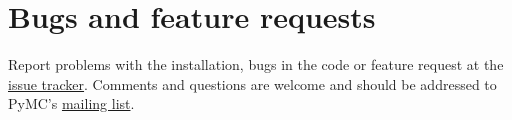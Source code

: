 
\hypertarget{bugs-and-feature-requests}{}
\section*{Bugs and feature requests}

Report problems with the installation, bugs in the code or feature request at 
the \href{http://code.google.com/p/pymc/issues/list.}{issue tracker}. Comments and questions are welcome and should be 
addressed to PyMC's \href{mailto:pymc-users@fisher.forestry.uga.edu}{mailing list}.

